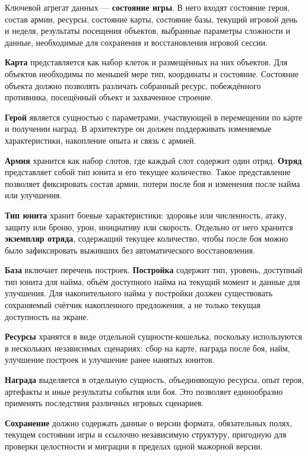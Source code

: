 \documentclass[12pt,a4paper]{article}
\begin{document}
Ключевой агрегат данных --- \textbf{состояние игры}. В него входят состояние героя, состав армии, ресурсы, состояние карты, состояние базы, текущий игровой день и неделя, результаты посещения объектов, выбранные параметры сложности и данные, необходимые для сохранения и восстановления игровой сессии.

\textbf{Карта} представляется как набор клеток и размещённых на них объектов. Для объектов необходимы по меньшей мере тип, координаты и состояние. Состояние объекта должно позволять различать собранный ресурс, побеждённого противника, посещённый объект и захваченное строение.

\textbf{Герой} является сущностью с параметрами, участвующей в перемещении по карте и получении наград. В архитектуре он должен поддерживать изменяемые характеристики, накопление опыта и связь с армией.

\textbf{Армия} хранится как набор слотов, где каждый слот содержит один отряд. \textbf{Отряд} представляет собой тип юнита и его текущее количество. Такое представление позволяет фиксировать состав армии, потери после боя и изменения после найма или улучшения.

\textbf{Тип юнита} хранит боевые характеристики: здоровье или численность, атаку, защиту или броню, урон, инициативу или скорость. Отдельно от него хранится \textbf{экземпляр отряда}, содержащий текущее количество, чтобы после боя можно было зафиксировать выживших без автоматического восстановления.

\textbf{База} включает перечень построек. \textbf{Постройка} содержит тип, уровень, доступный тип юнита для найма, объём доступного найма на текущий момент и данные для улучшения. Для накопительного найма у постройки должен существовать сохраняемый счётчик накопленного предложения, а не только текущая доступность на экране.

\textbf{Ресурсы} хранятся в виде отдельной сущности-кошелька, поскольку используются в нескольких независимых сценариях: сбор на карте, награда после боя, найм, улучшение построек и улучшение ранее нанятых юнитов.

\textbf{Награда} выделяется в отдельную сущность, объединяющую ресурсы, опыт героя, артефакты и иные результаты события или боя. Это позволяет единообразно применять последствия различных игровых сценариев.

\textbf{Сохранение} должно содержать данные о версии формата, обязательных полях, текущем состоянии игры и ссылочно независимую структуру, пригодную для проверки целостности и миграции в пределах одной мажорной версии.
\end{document}
